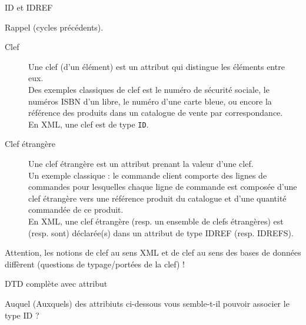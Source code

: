 \begin{frame}{ID et IDREF}

Rappel (cycles précédents).\\

\begin{description}
\item[Clef] Une clef (d’un élément) est un attribut qui distingue les éléments entre eux. \\
Des exemples classiques de clef est le numéro de sécurité sociale, le numéros ISBN d'un libre, le numéro d'une carte bleue, ou encore la référence des produits dans un catalogue de vente par correspondance.\\
En XML, une clef est de type \verb?ID?.

\item[Clef étrangère] Une clef étrangère est un attribut prenant la valeur d’une clef. \\
Un exemple classique : le commande client comporte des lignes de commandes pour lesquelles chaque ligne de commande est composée d'une clef étrangère vers une référence produit du catalogue et d'une quantité commandée de ce produit.\\
En XML, une clef étrangère (resp. un ensemble de clefs étrangères) est (resp. sont) déclarée(s) dans un attribut de type IDREF (resp. IDREFS).
\end{description}

\bigskip

Attention, les notions de clef au sens XML et de clef au sens des bases de données diffèrent (questions de typage/portées de la clef) !
\end{frame}


\begin{frame}[containsverbatim]{DTD complète avec attribut}



\begin{exoblock}
Auquel (Auxquels) des attribiuts ci-dessous vous semble-t-il pouvoir associer le type ID ? 
\end{exoblock}
\end{frame}

